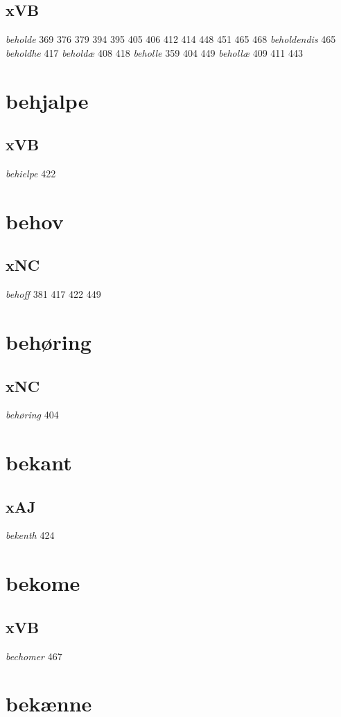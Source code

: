 \documentclass[a4paper,twocolumn]{article}
\begin{document}
\subsection{xVB}
\label{sec:org3094407}
\emph{beholde} 369 376 379 394 395 405 406 412 414 448 451 465 468 \emph{beholdendis} 465 \emph{beholdhe} 417 \emph{beholdæ} 408 418 \emph{beholle} 359 404 449 \emph{behollæ} 409 411 443 
\section{behjalpe}
\label{sec:org1fa9efd}
\subsection{xVB}
\label{sec:org2f71523}
\emph{behielpe} 422 
\section{behov}
\label{sec:org6125c05}
\subsection{xNC}
\label{sec:org8a8d48f}
\emph{behoff} 381 417 422 449 
\section{behøring}
\label{sec:orga9b5de6}
\subsection{xNC}
\label{sec:org36e282f}
\emph{behøring} 404 
\section{bekant}
\label{sec:org55d7010}
\subsection{xAJ}
\label{sec:org0f459d3}
\emph{bekenth} 424 
\section{bekome}
\label{sec:org4287345}
\subsection{xVB}
\label{sec:org837173b}
\emph{bechomer} 467 
\section{bekænne}
\label{sec:orgc1268e0}
\end{document}
